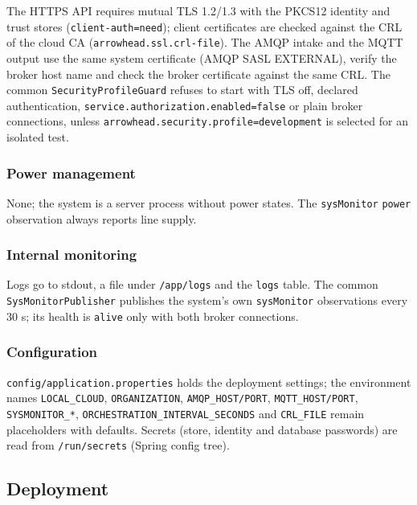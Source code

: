 \documentclass[a4paper]{arrowhead}
\begin{document}
The HTTPS API requires mutual TLS 1.2/1.3 with the PKCS12 identity and trust stores (\texttt{client-\allowbreak{}auth=need}); client certificates are checked against the CRL of the cloud CA (\texttt{arrowhead.\allowbreak{}ssl.\allowbreak{}crl-\allowbreak{}file}). The AMQP intake and the MQTT output use the same system certificate (AMQP SASL EXTERNAL), verify the broker host name and check the broker certificate against the same CRL. The common \texttt{SecurityProfileGuard} refuses to start with TLS off, declared authentication, \texttt{service.\allowbreak{}authorization.\allowbreak{}enabled=false} or plain broker connections, unless \texttt{arrowhead.\allowbreak{}security.\allowbreak{}profile=\allowbreak{}development} is selected for an isolated test.

\subsubsection{Power management}

None; the system is a server process without power states. The \texttt{sysMonitor} \texttt{power} observation always reports line supply.

\subsubsection{Internal monitoring}

Logs go to stdout, a file under \texttt{/app/logs} and the \texttt{logs} table. The common \texttt{SysMonitorPublisher} publishes the system's own \texttt{sysMonitor} observations every 30 s; its health is \texttt{alive} only with both broker connections.

\subsubsection{Configuration}

\texttt{config/\allowbreak{}application.\allowbreak{}properties} holds the deployment settings; the environment names \texttt{LOCAL\_\allowbreak{}CLOUD}, \texttt{ORGANIZATION}, \texttt{AMQP\_\allowbreak{}HOST/\allowbreak{}PORT}, \texttt{MQTT\_\allowbreak{}HOST/\allowbreak{}PORT}, \texttt{SYSMONITOR\_\allowbreak{}*}, \texttt{ORCHESTRATION\_\allowbreak{}INTERVAL\_\allowbreak{}SECONDS} and \texttt{CRL\_\allowbreak{}FILE} remain placeholders with defaults. Secrets (store, identity and database passwords) are read from \texttt{/run/secrets} (Spring config tree).

\subsection{Deployment}
\end{document}
